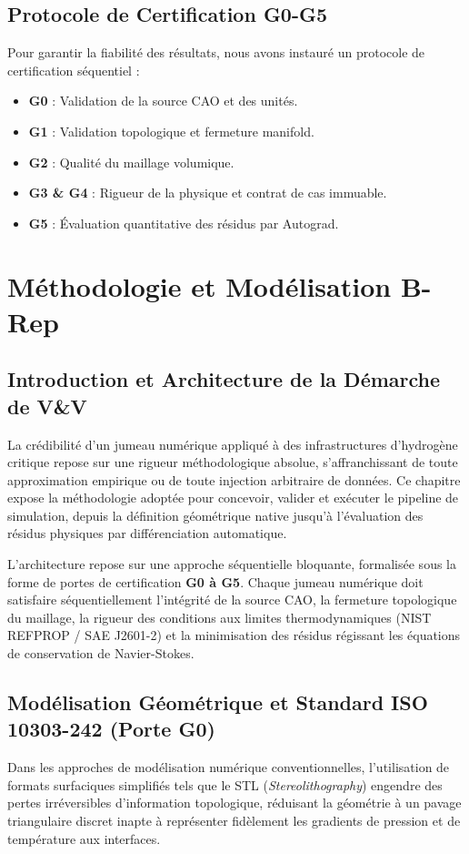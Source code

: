 \documentclass[12pt,a4paper,oneside]{report}
\begin{document}
\section{Protocole de Certification G0-G5}
Pour garantir la fiabilité des résultats, nous avons instauré un protocole de certification séquentiel :
\begin{itemize}
    \item \textbf{G0} : Validation de la source CAO et des unités.
    \item \textbf{G1} : Validation topologique et fermeture manifold.
    \item \textbf{G2} : Qualité du maillage volumique.
    \item \textbf{G3 \& G4} : Rigueur de la physique et contrat de cas immuable.
    \item \textbf{G5} : Évaluation quantitative des résidus par Autograd.
\end{itemize}

\chapter{Méthodologie et Modélisation B-Rep}
\section{Introduction et Architecture de la Démarche de V\&V}
La crédibilité d'un jumeau numérique appliqué à des infrastructures d'hydrogène critique repose sur une rigueur méthodologique absolue, s'affranchissant de toute approximation empirique ou de toute injection arbitraire de données. Ce chapitre expose la méthodologie adoptée pour concevoir, valider et exécuter le pipeline de simulation, depuis la définition géométrique native jusqu'à l'évaluation des résidus physiques par différenciation automatique. 

L'architecture repose sur une approche séquentielle bloquante, formalisée sous la forme de portes de certification \textbf{G0 à G5}. Chaque jumeau numérique doit satisfaire séquentiellement l'intégrité de la source CAO, la fermeture topologique du maillage, la rigueur des conditions aux limites thermodynamiques (NIST REFPROP / SAE J2601-2) et la minimisation des résidus régissant les équations de conservation de Navier-Stokes.

\section{Modélisation Géométrique et Standard ISO 10303-242 (Porte G0)}
Dans les approches de modélisation numérique conventionnelles, l'utilisation de formats surfaciques simplifiés tels que le STL (\textit{Stereolithography}) engendre des pertes irréversibles d'information topologique, réduisant la géométrie à un pavage triangulaire discret inapte à représenter fidèlement les gradients de pression et de température aux interfaces.
\end{document}

